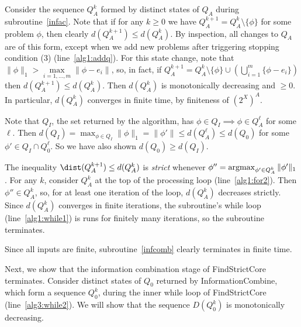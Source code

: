 \documentclass[11pt,reqno]{amsart}
\theoremstyle{definition}
\numberwithin{equation}{section}
\newcommand{\lft}{\left(}
\newcommand{\rt}{\right)}
\newcommand{\argmax}{\operatornamewithlimits{argmax}}
\newcommand{\pre}{\phi}
\newcommand{\prealloc}{(2^X)^A}
\newcommand{\acto}{Q_0}
\newcommand{\actok}{Q_0^k}
\newcommand{\acta}{Q_A}
\newcommand{\actak}{Q_A^k}
\newcommand{\actc}{Q_I}
\newcommand{\disto}{d}
\newcommand{\distt}{D}
\begin{document}
Consider the sequence $\actak$ formed by distinct states of $\acta$ during subroutine~\ref{infac}.
Note that if for any $k\geq 0$ we have $\acta^{k+1} = \actak \setminus \{\pre\}$ for some problem $\pre$, then clearly $\disto(\acta^{k+1}) \leq \disto(\actak)$.
By inspection, all changes to $\acta$ are of this form, except when we add new problems after triggering stopping condition (3) (line~\ref{alg1:addq}).
For this state change, note that $\|\pre\|_1 > \max\limits_{i = 1,\hdots,m} \|\pre - e_i\|$, so, in fact, if $\acta^{k+1} = \actak \setminus \{\pre\} \cup \lft \bigcup_{i =1}^m \{\pre - e_i \} \rt$ then $\disto(\acta^{k+1}) \leq \disto(\actak)$. 
Then $\disto(\actak)$ is monotonically decreasing and $\geq 0$.
In particular, $\disto(\actak)$ converges in finite time, by finiteness of $\prealloc$.

Note that $\actc$, the set returned by the algorithm, has $\pre \in \actc \implies \pre \in \acta^{\ell}$ for some $\ell$.
Then $\disto(\actc) = \max_{\pre\in\actc} \|\pre\|_1 = \|\pre'\| \leq \disto(\acta^{\ell}) \leq \disto(\acto)$ for some $\pre' \in \actc \cap \acto^{\ell}$.
So we have also shown $\disto(\acto) \geq \disto(\actc)$.

The inequality $\dist(\acta^{k+1}) \leq \disto(\actak)$ is \emph{strict} whenever $\pre'' = \argmax_{\pre' \in \actak} \|\pre'\|_1$. 
For any $k$, consider $\actak$ at the top of the processing loop (line~\ref{alg1:for2}). 
Then $\pre'' \in \actak$, so, for at least one iteration of the loop, $\disto(\actak)$ decreases strictly.
Since $\disto(\actak)$ converges in finite iterations, the subroutine's while loop (line~\ref{alg1:while1}) is runs for finitely many iterations, so the subroutine terminates.

Since all inputs are finite, subroutine~\ref{infcomb} clearly terminates in finite time.

Next, we show that the information combination stage of FindStrictCore terminates.
Consider distinct states of $\acto$ returned by InformationCombine, which form a sequence $\actok$, during the inner while loop of FindStrictCore (line~\ref{alg3:while2}).
We will show that the sequence $\distt(\actok)$ is monotonically decreasing.
\end{document}

